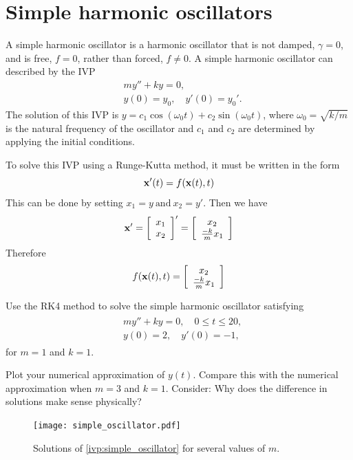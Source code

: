 \section*{Simple harmonic oscillators}
A simple harmonic oscillator is a harmonic oscillator that is not damped, $\gamma =0$, and is free, $f = 0$, rather than forced, $f \not = 0$. 
A simple harmonic oscillator can described by the IVP
\begin{align*}
&{}my'' + ky = 0,\\
&{}y(0) = y_0,\quad
y'(0) = y_0'.
\end{align*}
The solution of this IVP is $y = c_1\cos (\omega_0 t) + c_2 \sin (\omega_0 t)$, where $\omega_0 = \sqrt{k/m}$ is the natural frequency of the oscillator and $c_1$ and $c_2$ are determined by applying the initial conditions.

To solve this IVP using a Runge-Kutta method, it must be written in the form
\[\mathbf{x}'(t) = f(\mathbf{x}(t),t) \]
This can be done by setting $x_1 = y \ \text{and} \ x_2 = y'$. Then we have \[     \mathbf{x}'=
 \left[\begin{array}{c}x_1 \\x_2\end{array}\right]'  =  \left[\begin{array}{c}x_2 \\\frac{-k}{m}x_1\end{array}\right]\]
Therefore$$f(\mathbf{x}(t),t) = \left[\begin{array}{c}x_2 \\\frac{-k}{m}x_1\end{array}\right]$$

\begin{problem} Use the RK4 method to solve the simple harmonic oscillator satisfying 
\begin{align}
	\begin{split}
&{}my'' + ky = 0,\quad 0 \leq t \leq 20, \\
&{}y(0) = 2, \quad
y'(0) = -1,
	\end{split}
	\label{ivp:simple_oscillator}
\end{align}
for $m = 1$ and $k =1$.

Plot your numerical approximation of $y(t)$.  
Compare this with the numerical approximation when $m = 3$ and $k =1$. Consider: Why does the difference in solutions make sense physically?
\end{problem}


\begin{figure}[h]
\centering
\texttt{[image: simple\_oscillator.pdf]}
\caption{Solutions of \eqref{ivp:simple_oscillator} for several values of $m$.}
\label{ivp:simple_oscillator_figure}
\end{figure}


